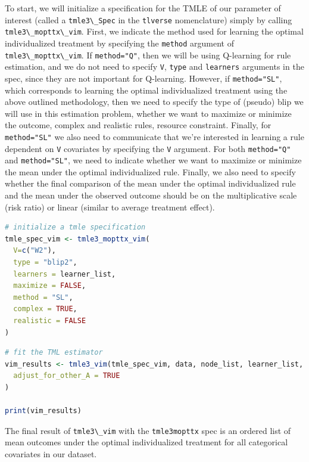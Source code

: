 \documentclass[
  12pt, krantz2,
]{krantz}
\newcommand{\passthrough}[1]{#1}
\theoremstyle{definition}
\theoremstyle{definition}
\theoremstyle{definition}
\newcommand{\1}{\mathbbm{1}}
\begin{document}
To start, we will initialize a specification for the TMLE of our parameter of
interest (called a \passthrough{\lstinline!tmle3\_Spec!} in the \passthrough{\lstinline!tlverse!} nomenclature) simply by calling
\passthrough{\lstinline!tmle3\_mopttx\_vim!}. First, we indicate the method used for learning the optimal
individualized treatment by specifying the \passthrough{\lstinline!method!} argument of
\passthrough{\lstinline!tmle3\_mopttx\_vim!}. If \passthrough{\lstinline!method="Q"!}, then we will be using Q-learning for rule
estimation, and we do not need to specify \passthrough{\lstinline!V!}, \passthrough{\lstinline!type!} and \passthrough{\lstinline!learners!} arguments
in the spec, since they are not important for Q-learning. However, if
\passthrough{\lstinline!method="SL"!}, which corresponds to learning the optimal individualized
treatment using the above outlined methodology, then we need to specify the type
of (pseudo) blip we will use in this estimation problem, whether we want to
maximize or minimize the outcome, complex and realistic rules, resource constraint.
Finally, for \passthrough{\lstinline!method="SL"!} we also need to communicate that we're interested in learning a
rule dependent on \passthrough{\lstinline!V!} covariates by specifying the \passthrough{\lstinline!V!} argument. For both
\passthrough{\lstinline!method="Q"!} and \passthrough{\lstinline!method="SL"!}, we need to indicate whether we want to maximize
or minimize the mean under the optimal individualized rule. Finally, we also
need to specify whether the final comparison of the mean under the optimal
individualized rule and the mean under the observed outcome should be on the
multiplicative scale (risk ratio) or linear (similar to average treatment
effect).

\begin{lstlisting}[language=R]
# initialize a tmle specification
tmle_spec_vim <- tmle3_mopttx_vim(
  V=c("W2"),
  type = "blip2",
  learners = learner_list,
  maximize = FALSE,
  method = "SL",
  complex = TRUE,
  realistic = FALSE
)
\end{lstlisting}

\begin{lstlisting}[language=R]
# fit the TML estimator
vim_results <- tmle3_vim(tmle_spec_vim, data, node_list, learner_list,
  adjust_for_other_A = TRUE
)

print(vim_results)
\end{lstlisting}

The final result of \passthrough{\lstinline!tmle3\_vim!} with the \passthrough{\lstinline!tmle3mopttx!} spec is an ordered list
of mean outcomes under the optimal individualized treatment for all categorical
covariates in our dataset.
\end{document}
